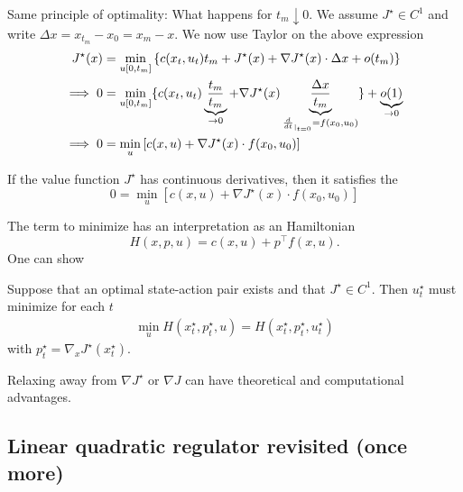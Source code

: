 Same principle of optimality: What happens for \(t_m\downarrow 0\). We assume 
\(J^\star\in C^1\)
and write \(\Delta x=x_{t_m}-x_0=x_m-x\). We now use Taylor on the above expression 
\begin{align*}
    J^\star(x)&= \min_{u[0,t_m]}\left\{c(x_t,u_t)t_m+J^\star(x)+\nabla J^\star(x)\cdot \Delta x + o(t_m)  \right\}\\
    \implies 0&=\min_{u[0,t_m]}\{c(x_t,u_t)\underbrace{\frac{t_m}{t_m}}_{\to 0}+\nabla J^\star(x)\underbrace{\frac{\Delta x}{t_m}}_{\frac{d}{dt}_{|_{t=0}}=f(x_0,u_0)}\} + \underbrace{o(1)}_{\to 0} \\
    \implies 0&=\min_{u}\left[c(x,u)+\nabla J^\star(x)\cdot f(x_0,u_0)\right]
\end{align*}

\begin{theorem}\label{thm:1.23}
    If the value function \(J^\star\) has continuous derivatives, then it 
    satisfies the 
    \begin{equation}\label{eq:hamilton_jacobi_bellmann}
        0=\min_{u}\left[c(x,u)+\nabla J^\star(x)\cdot f(x_0,u_0)\right]
    \end{equation}
\end{theorem}

The term to minimize  has an interpretation 
as an Hamiltonian 
\[H(x,p,u)=c(x,u)+p^\intercal f(x,u).\]
One can show 
\begin{theorem}\label{thm:1.24}
    Suppose that an optimal state-action pair exists 
    and that \(J^\star\in C^1\). Then \(u_t^\star\) must minimize
    for each \(t\) 
    \begin{align*}
        \min_u H(x_t^\star,p_t^\star,u)=H(x_t^\star,p_t^\star,u_t^\star)
    \end{align*}
    with \(p_t^\star=\nabla_x J^\star(x_t^\star)\).
\end{theorem}
\begin{remark}
    Relaxing away from \(\nabla J^\star\) or \(\nabla J\) can have 
    theoretical and computational advantages.
\end{remark}

\subsection{Linear quadratic regulator revisited (once more)}

